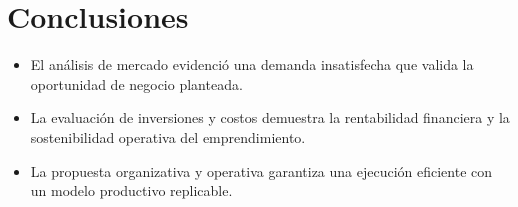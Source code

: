 \section*{Conclusiones}

\begin{itemize}
    \item El análisis de mercado evidenció una demanda insatisfecha que valida la oportunidad de negocio planteada.
    \item La evaluación de inversiones y costos demuestra la rentabilidad financiera y la sostenibilidad operativa del emprendimiento.
    \item La propuesta organizativa y operativa garantiza una ejecución eficiente con un modelo productivo replicable.
\end{itemize}
